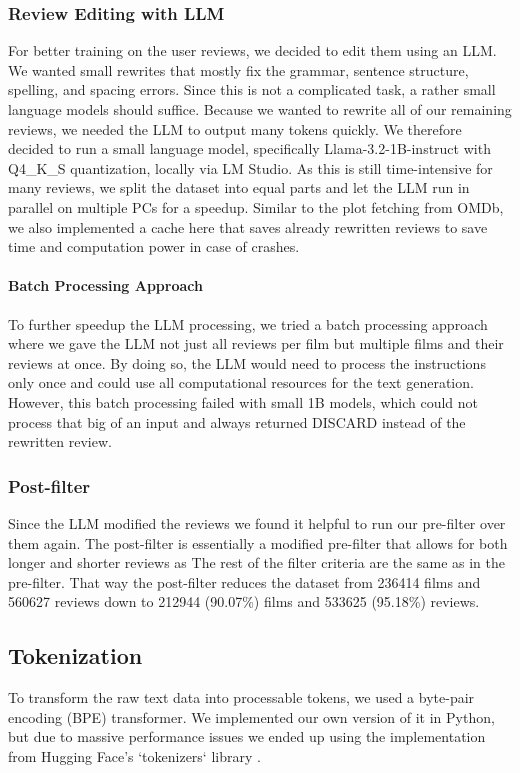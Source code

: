 \subsubsection*{Review Editing with LLM}
For better training on the user reviews, we decided to edit them using an LLM.
We wanted small rewrites that mostly fix the grammar, sentence structure, spelling, and spacing errors. %
Since this is not a complicated task, a rather small language models should suffice.
Because we wanted to rewrite all of our remaining reviews, we needed the LLM to output many tokens quickly.  
We therefore decided to run a small language model, specifically Llama-3.2-1B-instruct with Q4\_K\_S quantization, locally via LM Studio.
As this is still time-intensive for many reviews, we split the dataset into equal parts and let the LLM run in parallel on multiple PCs for a speedup.
Similar to the plot fetching from OMDb, we also implemented a cache here that saves already rewritten reviews to save time and computation power in case of crashes.

\paragraph{Batch Processing Approach}
To further speedup the LLM processing, we tried a batch processing approach where we gave the LLM not just all reviews per film but multiple films and their reviews at once.
By doing so, the LLM would need to process the instructions only once and could use all computational resources for the text generation.
However, this batch processing failed with small 1B models, which could not process that big of an input and always returned DISCARD instead of the rewritten review.


\subsubsection*{Post-filter}
Since the LLM modified the reviews we found it helpful to run our pre-filter over them again.
The post-filter is essentially a modified pre-filter that allows for both longer and shorter reviews as 
The rest of the filter criteria are the same as in the pre-filter.
That way the post-filter reduces the dataset from 236414 films and 560627 reviews down to 212944 (90.07\%) films and 533625 (95.18\%) reviews.



\subsection{Tokenization} \label{subsec:tokenization}
To transform the raw text data into processable tokens, we used a byte-pair encoding (BPE) transformer.
We implemented our own version of it in Python, but due to massive performance issues we ended up using the implementation from Hugging Face's `tokenizers` library \cite{hf-tokenizers}.